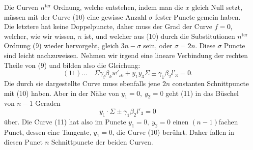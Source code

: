 \documentclass[10pt]{article}
\begin{document}
Die Curven \(n^{\text{ter}}\) Ordnung, welche entstehen, indem man die \(x\) gleich Null setzt, müssen mit der Curve (10) eine gewisse Anzahl \(\sigma\) fester Puncte gemein haben. Die letztere hat keine Doppelpuncte, daher muss der Grad der Curve \(f=0\), welcher, wie wir wissen, \(n\) ist, und welcher aus (10) durch die Substitutionen \(n^{\text{ter}}\) Ordnung (9) wieder hervorgeht, gleich \(3n-\sigma\) sein, oder \(\sigma=2n\). Diese \(\sigma\) Puncte sind leicht nachzuweisen. Nehmen wir irgend eine lineare Verbindung der rechten Theile von (9) und bilden also die Gleichung:
\[
(11)\ldots\quad
\Sigma\gamma_i\beta_kw'_{ik}+y_1y_3\Sigma\pm\gamma_1\beta_2l'_3=0.
\]
Die durch sie dargestellte Curve muss ebenfalls jene \(2n\) constanten Schnittpuncte mit (10) haben. Aber in der Nähe von \(y_1=0,\ y_2=0\) geht (11) in das Büschel von \(n-1\) Geraden
\[
y_1\cdot \Sigma\pm\gamma_1\beta_2l'_3=0
\]
über. Die Curve (11) hat also im Puncte \(y_1=0,\ y_2=0\) einen \((n-1)\)fachen Punct, dessen eine Tangente, \(y_1=0\), die Curve (10) berührt. Daher fallen in diesen Punct \(n\) Schnittpuncte der beiden Curven.
\end{document}
